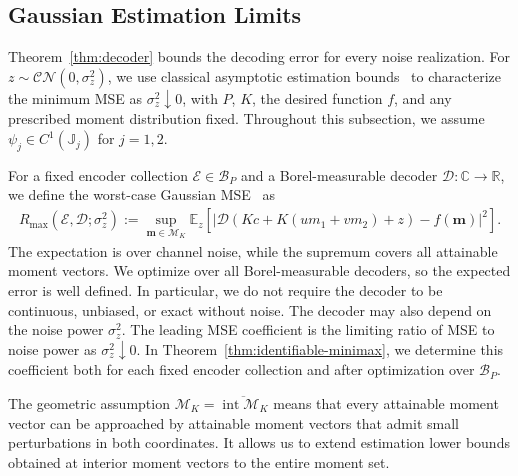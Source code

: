 \documentclass[journal,12pt,onecolumn,draftclsnofoot]{IEEEtran}
\newcommand{\enc}{\mathscr{E}}\newcommand{\dec}{\mathscr{D}}\newcommand{\R}{\mathbb R}\newcommand{\C}{\mathbb C}
\begin{document}
\subsection{Gaussian Estimation Limits}\label{sec:pareto}


Theorem~\ref{thm:decoder} bounds the decoding error for every noise realization. For $z\sim\mathcal{CN}(0,\sigma_z^2)$, we use classical asymptotic estimation bounds~\cite{gill1995,tsang2020,gassiat2024} to characterize the minimum MSE as $\sigma_z^2\downarrow0$, with $P$, $K$, the desired function $f$, and any prescribed moment distribution fixed. Throughout this subsection, we assume $\psi_j\in C^1(\mathbb J_j)$ for $j=1,2$.





For a fixed encoder collection $\enc\in\mathcal B_P$ and a Borel-measurable
decoder $\dec:\C\to\R$, we define the worst-case Gaussian MSE~\cite{jiao2015minimax} as
\begin{align*}
    R_{\max}(\enc,\dec;\sigma_z^2)
:=
\sup_{\boldsymbol m\in\mathcal M_K}
\mathbb E_z\!\left[
\left|\dec\!\left(Kc+K(um_1+vm_2)+z\right)
-f(\boldsymbol m)\right|^2
\right].
\end{align*}
The expectation is over channel noise, while the supremum covers all attainable moment vectors. We optimize over all Borel-measurable decoders, so the expected error is well defined. In particular, we do not require the decoder to be continuous, unbiased, or exact without noise. The decoder may also depend on the noise power $\sigma_z^2$. The leading MSE coefficient is the limiting ratio of MSE to noise power as $\sigma_z^2\downarrow0$. In Theorem~\ref{thm:identifiable-minimax}, we determine this coefficient both for each fixed encoder collection and after optimization over $\mathcal B_P$.

The geometric assumption $\mathcal M_K=\overline{\operatorname{int}\mathcal M_K}$ means that every attainable moment vector can be approached by attainable moment vectors that admit small perturbations in both coordinates. It allows us to extend estimation lower bounds obtained at interior moment vectors to the entire moment set.
\end{document}
